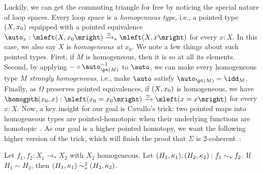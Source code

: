 Luckily, we can get the commuting triangle for free by noticing the special nature of loop spaces. Every loop space is a \emph{homogeneous type}, i.e., a pointed type $\mleft(X, x_0\mright)$ equipped with a pointed equivalence $\auto_x : \mleft(X, x_0\mright) \xrightarrow{\simeq}_{\ast} \mleft(X, x\mright)$ for every $x : X$. In this case, we also say $X$ is \emph{homogeneous at $x_0$}. We note a few things about such pointed types. First, if $M$ is homogeneous, then it is so at all its elements. Second, by applying ${-} \circ \auto_{\pt(M)}^{-1}$ to $\auto$, we can make every homogeneous type $M$ \emph{strongly homogeneous}, i.e., make $\auto$ satisfy $\auto_{\pt(M)} = \idd_M$. Finally, as $\Omega$ preserves pointed equivalences, if $\mleft(X, x_0\mright)$ is homogeneous, we have $\homogpth(x_0, x) : \mleft(x_0 = x_0\mright) \xrightarrow{\simeq} \mleft(x = x\mright)$ for every $x : X$. 
Now, a key insight for our goal is Cavallo's trick: two pointed maps into homogeneous types are pointed-homotopic when their underlying functions are homotopic~\cite[]{cubical}.
As our goal is a higher pointed homotopy, we want the following higher version of the trick, which will finish the proof that $\Sigma$ is $2$-coherent~\cite[]{2cohagda-pub}:
\begin{lem} \label{trick}
  Let $f_1, f_2 : X_1 \to_{\ast} X_2$ with $X_2$ homogeneous. Let $\mleft(H_1, \kappa_1\mright), \mleft(H_2, \kappa_2\mright) : f_1 \sim_{\ast} f_2$. If $H_1 \sim H_2$, then $\mleft(H_1, \kappa_1\mright) \sim_{\ast}^2 \mleft(H_2, \kappa_2\mright)$.
\end{lem}
